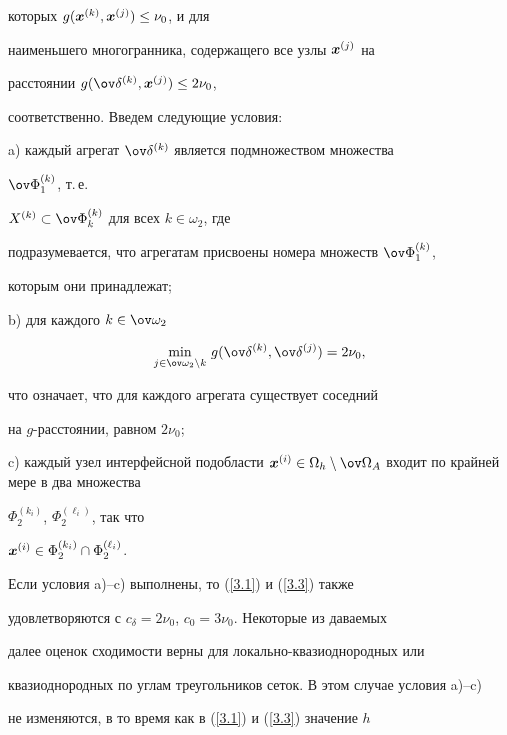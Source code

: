 которых $g(\boldsymbol x^{(k)},\boldsymbol x^{(j)})\le\nu_0$, и для


наименьшего многогранника, содержащего все узлы $\boldsymbol x^{(j)}$ на


расстоянии $g(\ov\delta\up k,\bi x\up j)\le 2\nu_0$,


соответственно. Введем следующие условия:





a) каждый агрегат $\ov\delta\up k$ является подмножеством множества


$\ov\Phi_1\up k$, т.\,е.


$X\up k\subset\ov\Phi_k\up k$ для всех $k\in\omega_2$, где


подразумевается, что агрегатам присвоены номера множеств $\ov\Phi_1\up k$,


которым они принадлежат;





b) для каждого $k\in\ov\omega_2$


$$


\min_{j\in\ov\omega_2\setminus k}\,


g(\ov\delta\up k, \ov\delta\up j)=2\nu_0,


$$


что означает, что для каждого агрегата существует соседний


на $g$-расстоянии, равном $2\nu_0$;





c) каждый узел интерфейсной подобласти $\bi x\up


i\in\Omega_h\setminus\ov\Omega_A$ входит по крайней мере в два множества


$\Phi_2^{(k_i)}$, $\Phi_2^{(\ell_i)}$, так что


$\boldsymbol x^{(i)}\in\Phi_2^{(k_i)}\cap\Phi_2^{(\ell_i)}$.





Если условия a)--c) выполнены, то (\ref{3.1}) и (\ref{3.3}) также


удовлетворяются с $c_\delta=2\nu_0$, $c_0=3\nu_0$. Некоторые из даваемых


далее оценок сходимости верны для локально-квазиоднородных или


квазиоднородных по углам треугольников сеток. В этом случае условия a)--c)


не изменяются, в то время как в (\ref{3.1}) и (\ref{3.3}) значение $h$


